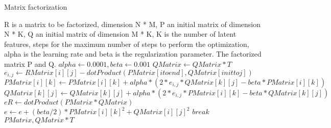 \begin{algorithm}
\caption{Matrix factorization}
\begin{algorithmic}
\REQUIRE R is a matrix to be factorized, dimension N * M, P an initial
matrix of dimension N * K, Q an initial matrix of dimension M * K, K
is the number of latent features, steps for the maximum number of
steps to perform the optimization,  alpha is the learning rate and
beta  is the regularization parameter.
\ENSURE The factorized matrix P and Q.
\STATE $alpha \leftarrow 0.0001, beta \leftarrow 0.001$ 
\STATE $QMatrix \leftarrow QMatrix * T $ 
\STATE $e_{i,j} \leftarrow RMatrix[i][j]-dotProduct(PMatrix[i to end],QMatrix[init to j])$
\ENDIF
{}
\STATE $PMatrix[i][k] \leftarrow PMatrix[i][k]+alpha * (2*e_{i,j}*QMatrix[k][j] - beta *PMatrix[i][k])$
\STATE $QMatrix[k][j] \leftarrow QMatrix[k][j]+alpha * (2*e_{i,j}*PMatrix[i][k] - beta *QMatrix[k][j])$
\ENDFOR
\ENDFOR
\ENDFOR
\STATE $eR \leftarrow dotProduct (PMatrix * QMatrix)$
\STATE $e \leftarrow e + (beta/2) * PMatrix[i][k]^2 + QMatrix[i][j]^2$
\ENDIF
\ENDFOR
\ENDFOR
{}
\STATE $break$
\ENDIF
\ENDFOR
\RETURN $PMatrix, QMatrix * T$ 
\end{algorithmic}
\end{algorithm}

